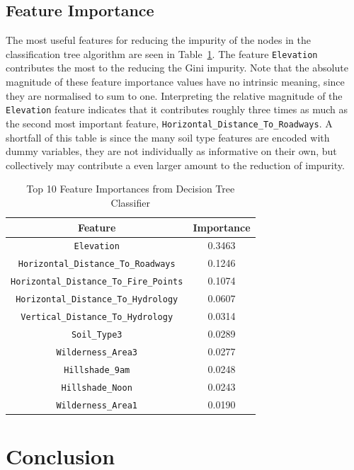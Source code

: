\documentclass[10pt, conference]{IEEEtran}
\begin{document}
\subsection{Feature Importance}
The most useful features for reducing the impurity of the nodes in the classification tree algorithm are seen in Table~\ref{tab:feature_importance}. The feature \texttt{Elevation} contributes the most to the reducing the Gini impurity. Note that the absolute magnitude of these feature importance values have no intrinsic meaning, since they are normalised to sum to one. Interpreting the relative magnitude of the \texttt{Elevation} feature indicates that it contributes roughly three times as much as the second most important feature, \texttt{Horizontal\_Distance\_To\_Roadways}. A shortfall of this table is since the many soil type features are encoded with dummy variables, they are not individually as informative on their own, but collectively may contribute a even larger amount to the reduction of impurity. 

\begin{table}[!th]
	\caption{Top 10 Feature Importances from Decision Tree Classifier}
	\label{tab:feature_importance}
	\centering
	\begin{tabular}{|c|c|}
		\hline
		\textbf{Feature} & \textbf{Importance} \\
		\hline
		\texttt{Elevation} & 0.3463 \\
		\texttt{Horizontal\_Distance\_To\_Roadways} & 0.1246 \\
		\texttt{Horizontal\_Distance\_To\_Fire\_Points} & 0.1074 \\
		\texttt{Horizontal\_Distance\_To\_Hydrology} & 0.0607 \\
		\texttt{Vertical\_Distance\_To\_Hydrology} & 0.0314 \\
		\texttt{Soil\_Type3} & 0.0289 \\
		\texttt{Wilderness\_Area3} & 0.0277 \\
		\texttt{Hillshade\_9am} & 0.0248 \\
		\texttt{Hillshade\_Noon} & 0.0243 \\
		\texttt{Wilderness\_Area1} & 0.0190 \\
		\hline
	\end{tabular}
\end{table}



\section{Conclusion}



\end{document}

